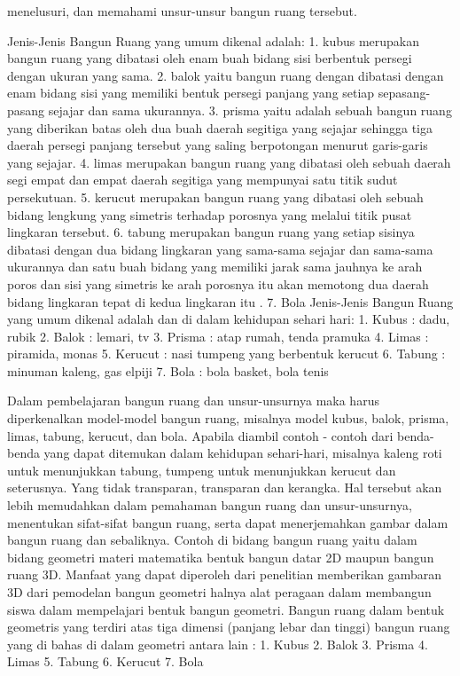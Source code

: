 menelusuri, dan memahami unsur-unsur bangun ruang tersebut.

Jenis-Jenis Bangun Ruang yang umum dikenal adalah:
1. kubus merupakan bangun ruang yang dibatasi oleh enam buah bidang sisi berbentuk persegi dengan ukuran yang sama.
2. balok yaitu bangun ruang dengan dibatasi dengan enam bidang sisi yang memiliki bentuk persegi panjang yang setiap sepasang-pasang sejajar dan sama ukurannya.
3. prisma yaitu adalah sebuah bangun ruang yang diberikan batas oleh dua buah daerah segitiga yang sejajar sehingga tiga daerah persegi panjang tersebut yang saling berpotongan menurut garis-garis yang sejajar.
4. limas merupakan bangun ruang yang dibatasi oleh sebuah daerah segi empat dan empat daerah segitiga yang mempunyai satu titik sudut persekutuan.
5. kerucut merupakan bangun ruang yang dibatasi oleh sebuah bidang lengkung yang simetris terhadap porosnya yang melalui titik pusat lingkaran tersebut.
6. tabung merupakan bangun ruang yang setiap sisinya dibatasi dengan dua bidang lingkaran yang sama-sama sejajar dan sama-sama ukurannya dan satu buah bidang 
     yang memiliki jarak sama jauhnya ke arah poros dan sisi yang simetris ke arah porosnya itu akan memotong dua daerah bidang lingkaran tepat di kedua lingkaran itu .
7. Bola
Jenis-Jenis Bangun Ruang yang umum dikenal adalah dan di dalam kehidupan sehari hari:
1.   Kubus    : dadu, rubik
2.   Balok    : lemari, tv
3.   Prisma   : atap rumah, tenda pramuka
4.   Limas    : piramida, monas
5.   Kerucut  : nasi tumpeng yang berbentuk kerucut
6.   Tabung   : minuman kaleng, gas elpiji
7.   Bola     : bola basket, bola tenis

Dalam pembelajaran bangun ruang dan unsur-unsurnya maka harus diperkenalkan model-model bangun ruang, misalnya model kubus, balok, prisma, limas, tabung, kerucut, dan bola. Apabila diambil contoh - contoh dari benda-benda yang dapat ditemukan dalam kehidupan sehari-hari, misalnya kaleng roti untuk menunjukkan tabung, tumpeng untuk menunjukkan kerucut dan seterusnya. Yang tidak transparan, transparan dan kerangka. Hal tersebut akan lebih memudahkan dalam pemahaman bangun ruang dan unsur-unsurnya, menentukan sifat-sifat bangun ruang, serta dapat menerjemahkan gambar dalam bangun ruang dan sebaliknya.
Contoh di bidang bangun ruang yaitu dalam bidang geometri  materi matematika bentuk bangun datar 2D maupun bangun ruang 3D. 
Manfaat yang dapat diperoleh dari penelitian memberikan gambaran 3D dari pemodelan bangun geometri halnya alat peragaan dalam membangun siswa dalam mempelajari bentuk bangun geometri.
Bangun ruang dalam bentuk geometris yang terdiri atas tiga dimensi (panjang lebar dan tinggi) bangun ruang yang di bahas di dalam geometri antara lain :
1.    Kubus
2.    Balok 
3.    Prisma
4.    Limas
5.    Tabung
6.    Kerucut
7.    Bola


